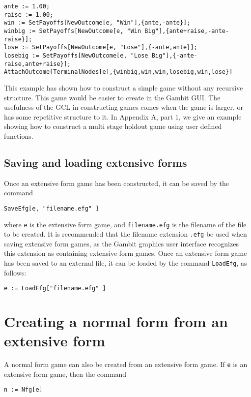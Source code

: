 \begin{verbatim}
ante := 1.00;
raise := 1.00;
win := SetPayoffs[NewOutcome[e, "Win"],{ante,-ante}];
winbig := SetPayoffs[NewOutcome[e, "Win Big"],{ante+raise,-ante-raise}];
lose := SetPayoffs[NewOutcome[e, "Lose"],{-ante,ante}];
losebig := SetPayoffs[NewOutcome[e, "Lose Big"],{-ante-raise,ante+raise}];
AttachOutcome[TerminalNodes[e],{winbig,win,win,losebig,win,lose}]
\end{verbatim}

This example has shown how to construct a simple game without any
recursive structure.  This game would be easier to create in the
Gambit GUI.  The usefulness of the GCL in constructing games comes
when the game is larger, or has some repetitive structure to it.  In
Appendix A, part 1, we give an example showing how to construct a multi stage
holdout game using user defined functions. 

\subsection{Saving and loading extensive forms}

Once an extensive form game has been constructed, it can be saved by
the command 

\begin{verbatim}
SaveEfg[e, "filename.efg" ]
\end{verbatim}

\noindent where \verb+e+ is the extensive form game, and
\verb+filename.efg+ is the filename of the file to be created.  It is
recommended that the filename extension \verb+.efg+ be used when
saving extensive form games, as the Gambit graphics user interface
recognizes this extension as containing extensive form games.  Once an
extensive form game has been saved to an external file, it can be
loaded by the command \verb+LoadEfg+, as follows:

\begin{verbatim}
e := LoadEfg["filename.efg" ]
\end{verbatim}

\section{Creating a normal form from an extensive form}

A normal form game can also be created from an extensive form game.
If \verb+e+ is an extensive form game, then the command 

\begin{verbatim}
n := Nfg[e]
\end{verbatim}

